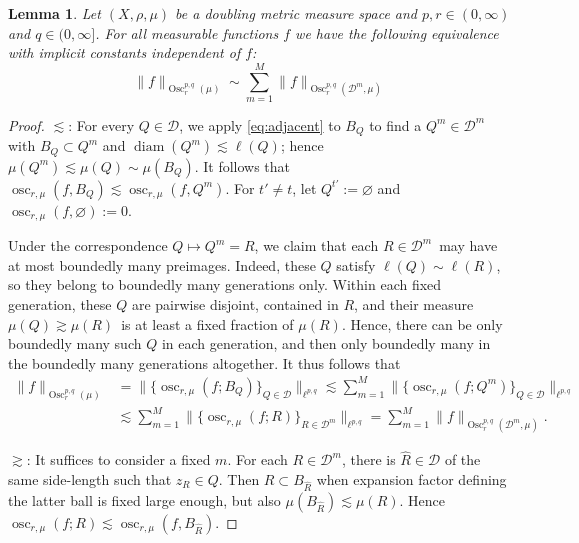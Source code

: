 \documentclass[10pt,a4paper]{amsart}
\newtheorem{lemma}{Lemma}
\newcommand{\BNorm}[2]{\Big\|#1\Big\|_{#2}}
\newcommand{\Norm}[2]{\|#1\|_{#2}}
\begin{document}
\begin{lemma}\label{lem:Osc=Osc(D)}
Let $(X,\rho,\mu)$ be a doubling metric measure space and $p,r\in(0,\infty)$ and $q\in(0,\infty]$.
For all measurable functions $f$ we have the following equivalence with implicit constants independent of $f$:
\begin{equation*}
  \Norm{f}{\operatorname{Osc}^{p,q}_r(\mu)}
  \sim\sum_{m=1}^M \Norm{f}{\operatorname{Osc}^{p,q}_r(\mathscr D^m,\mu)}
\end{equation*}
\end{lemma}

\begin{proof}
$\lesssim$: For every $Q\in \mathscr D$, we apply \eqref{eq:adjacent} to $B_Q$ to find a $Q^m\in\mathscr D^m$ with $B_Q\subset Q^m$ and $\operatorname{diam}(Q^m)\lesssim\ell(Q)$; hence $\mu(Q^m)\lesssim\mu(Q)\sim\mu(B_Q)$.
It follows that $\operatorname{osc}_{r,\mu}(f,B_Q)\lesssim\operatorname{osc}_{r,\mu}(f,Q^m)$. For $t'\neq t$, let $Q^{t'}:=\varnothing$ and $\operatorname{osc}_{r,\mu}(f,\varnothing):=0$.

Under the correspondence $Q\mapsto Q^m=R$, we claim that each $R\in\mathscr D^m$ may have at most boundedly many preimages. Indeed, these $Q$ satisfy $\ell(Q)\sim\ell(R)$, so they belong to boundedly many generations only. Within each fixed generation, these $Q$ are pairwise disjoint, contained in $R$, and their measure $\mu(Q)\gtrsim\mu(R)$ is at least a fixed fraction of $\mu(R)$. Hence, there can be only boundedly many such $Q$ in each generation, and then only boundedly many in the boundedly many generations altogether. It thus follows that
\begin{equation*}
\begin{split}
  \Norm{f}{\operatorname{Osc}^{p,q}_r(\mu)}
  &=\BNorm{\Big\{\operatorname{osc}_{r,\mu}(f;B_Q)\Big\}_{Q\in\mathscr D}}{\ell^{p,q}}
  \lesssim\sum_{m=1}^M \BNorm{\Big\{\operatorname{osc}_{r,\mu}(f;Q^m)\Big\}_{Q\in\mathscr D}}{\ell^{p,q}} \\
  &\lesssim\sum_{m=1}^M \BNorm{\Big\{\operatorname{osc}_{r,\mu}(f;R)\Big\}_{R\in\mathscr D^m}}{\ell^{p,q}}
  =\sum_{m=1}^M \Norm{f}{\operatorname{Osc}^{p,q}_r(\mathscr D^m,\mu)}.
\end{split}
\end{equation*}

$\gtrsim$: It suffices to consider a fixed $m$. For each $R\in\mathscr D^m$, there is $\hat R\in\mathscr D$ of the same side-length such that $z_R\in Q$. Then $R\subset B_{\hat R}$ when expansion factor defining the latter ball is fixed large enough, but also $\mu(B_{\hat R})\lesssim\mu(R)$. Hence $\operatorname{osc}_{r,\mu}(f;R)\lesssim\operatorname{osc}_{r,\mu}(f,B_{\hat R})$.


\end{proof}
\end{document}
